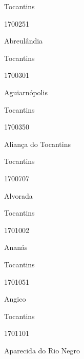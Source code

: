 \documentclass[
  letterpaper,
]{report}
\begin{document}
Tocantins

\n      

1700251

\n      

Abreulândia

\n    

\n    

\n      

Tocantins

\n      

1700301

\n      

Aguiarnópolis

\n    

\n    

\n      

Tocantins

\n      

1700350

\n      

Aliança do Tocantins

\n    

\n    

\n      

Tocantins

\n      

1700707

\n      

Alvorada

\n    

\n    

\n      

Tocantins

\n      

1701002

\n      

Ananás

\n    

\n    

\n      

Tocantins

\n      

1701051

\n      

Angico

\n    

\n    

\n      

Tocantins

\n      

1701101

\n      

Aparecida do Rio Negro
\end{document}
